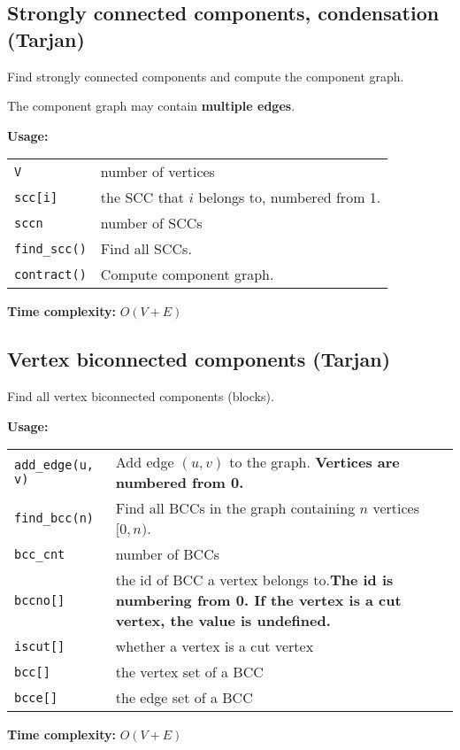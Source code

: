 \subsection{Strongly connected components, condensation (Tarjan)}
Find strongly connected components and compute the component graph. \par
\Warning The component graph may contain \textbf{multiple edges}. \par
\textbf{Usage:} \\[0.1cm]
\begin{tabular}{p{2.5cm} p{9cm}}
  \lstinline|V| & number of vertices \\
  \lstinline|scc[i]| & the SCC that $i$ belongs to, numbered from 1. \\
  \lstinline|sccn| & number of SCCs \\
  \lstinline|find_scc()| & Find all SCCs. \\
  \lstinline|contract()| & Compute component graph. \\
\end{tabular} \par
\textbf{Time complexity:} $O(V + E)$ \par


\subsection{Vertex biconnected components (Tarjan)}
Find all vertex biconnected components (blocks). \par
\textbf{Usage:} \\[0.1cm]
\begin{tabular}{p{2.5cm} p{9cm}}
  \lstinline|add_edge(u, v)| & Add edge $(u, v)$ to the graph. \textbf{Vertices are numbered from 0.}\\
  \lstinline|find_bcc(n)| & Find all BCCs in the graph containing $n$ vertices $[0, n)$.  \\
  \lstinline|bcc_cnt| & number of BCCs \\
  \lstinline|bccno[]| & the id of BCC a vertex belongs to.\textbf{The id is numbering from 0. If the vertex is a cut vertex, the value is undefined.} \\
  \lstinline|iscut[]| & whether a vertex is a cut vertex \\
  \lstinline|bcc[]| & the vertex set of a BCC \\
  \lstinline|bcce[]| & the edge set of a BCC \\
\end{tabular} \par
\textbf{Time complexity:} $O(V + E)$ \par


